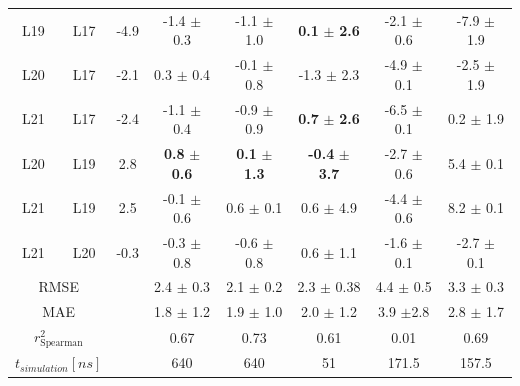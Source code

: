 \begin{table}[h]
\begin{center}
{\begin{tabular}{ c c |c |c|c|c|c|c}
        L19 &  L17 & -4.9 & -1.4 $\pm$ 0.3          & -1.1 $\pm$ 1.0         & \textbf{0.1} $\pm$ \textbf{2.6}                    &   -2.1 $\pm$ 0.6 & -7.9 $\pm$ 1.9\\
        L20 &  L17 & -2.1 &  0.3 $\pm$ 0.4          & -0.1 $\pm$ 0.8         & -1.3 $\pm$ 2.3                                     &   -4.9 $\pm$ 0.1 & -2.5 $\pm$ 1.9\\
        L21 &  L17 & -2.4 & -1.1 $\pm$ 0.4          & -0.9 $\pm$ 0.9         &\textbf{0.7} $\pm$ \textbf{2.6}                     &  -6.5 $\pm$ 0.1 &  0.2 $\pm$ 1.9\\
        L20 &  L19 & 2.8  &\textbf{0.8} $\pm$ \textbf{0.6}   & \textbf{0.1} $\pm$ \textbf{1.3} & \textbf{-0.4} $\pm$ \textbf{3.7} &  -2.7 $\pm$ 0.6 &  5.4 $\pm$ 0.1\\
        L21 &  L19 & 2.5  & -0.1 $\pm$ 0.6         &  0.6 $\pm$ 0.1         &  0.6 $\pm$ 4.9                                      &  -4.4 $\pm$ 0.6 &  8.2 $\pm$ 0.1\\
        L21 &  L20 & -0.3 & -0.3 $\pm$ 0.8         & -0.6 $\pm$ 0.8         &  0.6 $\pm$ 1.1                                    &    -1.6 $\pm$ 0.1 &   -2.7 $\pm$ 0.1\\ 
    \hline
        \multicolumn{2}{c|}{RMSE} &                    & 2.4  $\pm$ 0.3           & 2.1  $\pm$ 0.2          &  2.3  $\pm$ 0.38      & 4.4 $\pm$ 0.5         & 3.3  $\pm$ 0.3 \\
        \multicolumn{2}{c|}{MAE} &                     & 1.8 $\pm$ 1.2 & 1.9 $\pm$ 1.0 & 2.0 $\pm$ 1.2 & 3.9 $\pm$2.8 & 2.8 $\pm$ 1.7 \\
        \multicolumn{2}{c|}{$r^2_{\text{Spearman}}$} & & 0.67           & 0.73          & 0.61          & 0.01           & 0.69 \\
        \multicolumn{2}{c|}{$t_{simulation} [ns]$} & & 640          &  640         &  51        & 171.5         & 157.5  \\
\end{tabular}
}
\end{center}
\label{tab: RE-EDS_FE_RingCycleOpening_ddF}
\end{table}

% 
%


